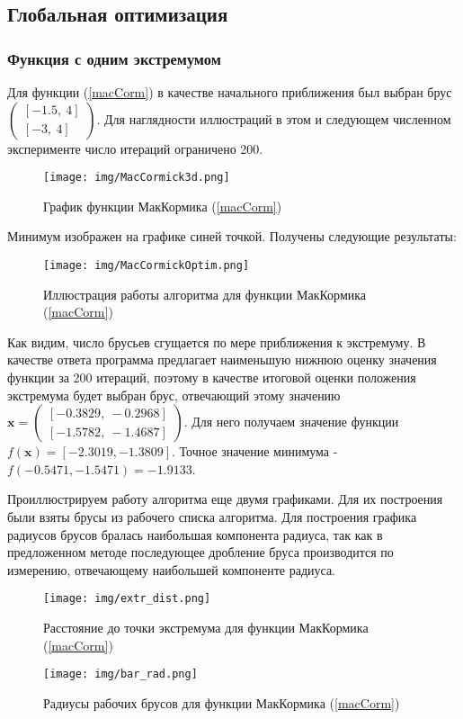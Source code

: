 \documentclass[a4paper]{article}
\begin{document}
\subsection{Глобальная оптимизация}
\subsubsection{Функция с одним экстремумом}
Для функции (\ref{macCorm}) в качестве начального приближения был выбран брус $\begin{pmatrix}
[-1.5,\: 4]\\
[-3,\: 4]
\end{pmatrix}$. Для наглядности иллюстраций в этом и следующем численном эксперименте число итераций ограничено 200.
\begin{figure}[H]
    \centering
    \texttt{[image: img/MacCormick3d.png]}
    \caption{График функции МакКормика (\ref{macCorm})}
    \label{fig:macCorm}
\end{figure}
Минимум изображен на графике синей точкой. Получены следующие результаты:
\begin{figure}[H]
    \centering
    \texttt{[image: img/MacCormickOptim.png]}
    \caption{Иллюстрация работы алгоритма для функции МакКормика (\ref{macCorm})}
    \label{fig:proc1}
\end{figure}
Как видим, число брусьев сгущается по мере приближения к экстремуму. В качестве ответа программа предлагает наименьшую нижнюю оценку значения функции за 200 итераций, поэтому в качестве итоговой оценки положения экстремума будет выбран брус, отвечающий этому значению $\mathbf{x}=\begin{pmatrix}
[   -0.3829,\:    -0.2968]\\ 
[   -1.5782,\:   -1.4687]
\end{pmatrix}$. Для него получаем значение функции $f(\mathbf{x})=[   -2.3019,    -1.3809]$. Точное значение минимума - $f(-0.5471, -1.5471)=-1.9133$. 

Проиллюстрируем работу алгоритма еще двумя графиками. Для их построения были взяты брусы из рабочего списка алгоритма. Для построения графика радиусов брусов бралась наибольшая компонента радиуса, так как в предложенном методе последующее дробление бруса производится по измерению, отвечающему наибольшей компоненте радиуса.
\begin{figure}[H]
    \centering
    \texttt{[image: img/extr\_dist.png]}
    \caption{Расстояние до точки экстремума для функции МакКормика (\ref{macCorm})}
    \label{fig:mcExtr}
\end{figure}
\begin{figure}[H]
    \centering
    \texttt{[image: img/bar\_rad.png]}
    \caption{Радиусы рабочих брусов для функции МакКормика (\ref{macCorm})}
    \label{fig:mcRad}
\end{figure}
\end{document}
